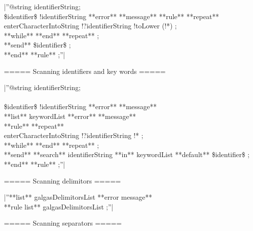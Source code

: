 {|''@string identifierString;\\ 
\$identifier\$ !identifierString **error** **message** %
**rule** %
 **repeat**\\ 
  enterCharacterIntoString !?identifierString !toLower (!*) ;\\ 
 **while** %
 **end** **repeat** ;\\ 
 **send** \$identifier\$ ;\\
**end** **rule** ;''|

===== Scanning identifiers and key words =====

|''@string identifierString;\\ 
\\ 
\$identifier\$ !identifierString **error** **message** %
\\ 
**list** keywordList **error** **message** %
\\ 
**rule** %
 **repeat**\\ 
  enterCharacterIntoString !?identifierString !* ;\\ 
 **while** %
 **end** **repeat** ;\\ 
 **send** **search** identifierString **in** keywordList  **default** \$identifier\$ ;\\
**end** **rule** ;''|

===== Scanning delimitors =====

|''**list** galgasDelimitorsList **error message** %
\\ 
**rule list** galgasDelimitorsList ;''|

===== Scanning separators =====

}
